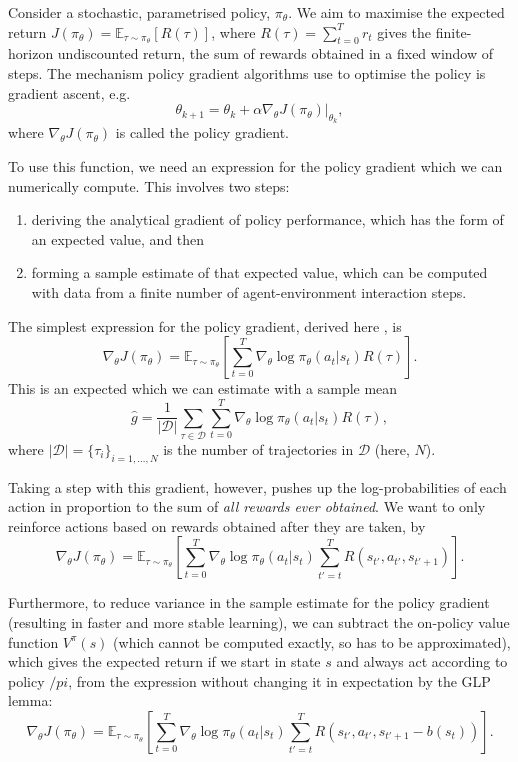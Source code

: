 \documentclass{article}
\begin{document}
Consider a stochastic, parametrised policy, $\pi_\theta$. We aim to maximise the expected return $J(\pi_\theta) = \mathbb{E}_{\tau \sim \pi_\theta} \left[ R(\tau) \right]$, where $R(\tau) = \sum_{t=0}^Tr_t$ gives the finite-horizon undiscounted return, the sum of rewards obtained in a fixed window of steps. The mechanism policy gradient algorithms use to optimise the policy is gradient ascent, e.g. $$\theta_{k+1} = \theta_k + \alpha \nabla_\theta J(\pi_\theta) |_{\theta_k},$$ where $\nabla_\theta J(\pi_\theta)$ is called the policy gradient.

To use this function, we need an expression for the policy gradient which we can numerically compute. This involves two steps:
\begin{enumerate}
  \item deriving the analytical gradient of policy performance, which has the form of an expected value, and then
  \item forming a sample estimate of that expected value, which can be computed with data from a finite number of agent-environment interaction steps.
\end{enumerate}

The simplest expression for the policy gradient, derived here \cite{}, is $$\nabla_\theta J(\pi_\theta) = \mathbb{E}_{\tau \sim \pi_\theta} \left[ \sum_{t=0}^T \nabla_\theta \log \pi_\theta(a_t | s_t) R(\tau) \right].$$ This is an expected which we can estimate with a sample mean $$\hat{g} = \frac{1}{\lvert \mathcal{D} \rvert} \sum_{\tau \in \mathcal{D}} \sum_{t=0}^T \nabla_\theta \log \pi_\theta(a_t | s_t) R(\tau),$$ where $\lvert \mathcal{D} \rvert = \{ \tau_i \}_{i=1, \dots, N}$ is the number of trajectories in $\mathcal{D}$ (here, $N$).

Taking a step with this gradient, however, pushes up the log-probabilities of each action in proportion to the sum of \textit{all rewards ever obtained}. We want to only reinforce actions based on rewards obtained after they are taken, by $$\nabla_\theta J(\pi_\theta) = \mathbb{E}_{\tau \sim \pi_\theta} \left[ \sum_{t=0}^T \nabla_\theta \log \pi_\theta(a_t | s_t) \sum_{t'=t}^T R(s_{t'}, a_{t'}, s_{t'+1}) \right].$$

Furthermore, to reduce variance in the sample estimate for the policy gradient (resulting in faster and more stable learning), we can subtract the on-policy value function $V^\pi(s)$ (which cannot be computed exactly, so has to be approximated), which gives the expected return if we start in state $s$ and always act according to policy $/pi$, from the expression without changing it in expectation by the GLP lemma: $$\nabla_\theta J(\pi_\theta) = \mathbb{E}_{\tau \sim \pi_\theta} \left[ \sum_{t=0}^T \nabla_\theta \log \pi_\theta(a_t | s_t) \sum_{t'=t}^T R \left( s_{t'}, a_{t'}, s_{t'+1} - b(s_t)\right) \right].$$ 
\end{document}
